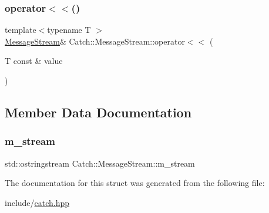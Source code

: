 \subsubsection{\texorpdfstring{operator$<$$<$()}{operator<<()}}
{\footnotesize\ttfamily template$<$typename T $>$ \\
\mbox{\hyperlink{structCatch_1_1MessageStream}{Message\+Stream}}\& Catch\+::\+Message\+Stream\+::operator$<$$<$ (\begin{DoxyParamCaption}\item[{T const \&}]{value }\end{DoxyParamCaption})\hspace{0.3cm}{\ttfamily [inline]}}



\subsection{Member Data Documentation}
\mbox{\label{structCatch_1_1MessageStream_a0fc1529663b32a29f3232d96d8b50188}} 
\subsubsection{\texorpdfstring{m\+\_\+stream}{m\_stream}}
{\footnotesize\ttfamily std\+::ostringstream Catch\+::\+Message\+Stream\+::m\+\_\+stream}



The documentation for this struct was generated from the following file\+:\begin{DoxyCompactItemize}
\item 
include/\mbox{\hyperlink{catch_8hpp}{catch.\+hpp}}\end{DoxyCompactItemize}
